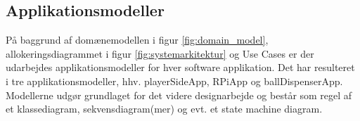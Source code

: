 \documentclass[Arkitektur/System_main.tex]{subfiles}
\begin{document}
\subsection{Applikationsmodeller}

På baggrund af domænemodellen i figur \ref{fig:domain_model}, allokeringsdiagrammet i figur \ref{fig:systemarkitektur} og Use Cases er der udarbejdes applikationsmodeller for hver software applikation. Det har resulteret i tre applikationsmodeller, hhv. playerSideApp, RPiApp og ballDispenserApp. Modellerne udgør grundlaget for det videre designarbejde og består som regel af et klassediagram, sekvensdiagram(mer) og evt. et state machine diagram.


\newpage


\end{document}
